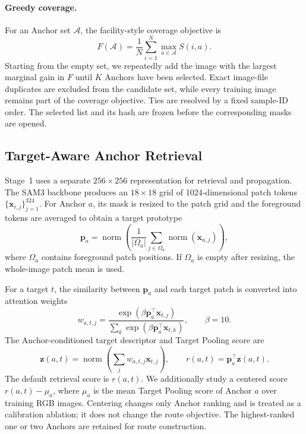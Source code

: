 \documentclass[a4paper,fleqn]{cas-dc}
\begin{document}
\paragraph{Greedy coverage.}
For an Anchor set $\mathcal{A}$, the facility-style coverage objective is
\begin{equation}
F(\mathcal{A})=\frac{1}{N}\sum_{i=1}^{N}\max_{a\in\mathcal{A}}S(i,a).
\end{equation}
Starting from the empty set, we repeatedly add the image with the largest marginal gain in $F$ until $K$ Anchors have been selected. Exact image-file duplicates are excluded from the candidate set, while every training image remains part of the coverage objective. Ties are resolved by a fixed sample-ID order. The selected list and its hash are frozen before the corresponding masks are opened.

\subsection{Target-Aware Anchor Retrieval}\label{sec:target-pooling}

Stage~1 uses a separate $256\times256$ representation for retrieval and propagation. The SAM3 backbone produces an $18\times18$ grid of 1024-dimensional patch tokens $\{\mathbf{x}_{i,j}\}_{j=1}^{324}$. For Anchor $a$, its mask is resized to the patch grid and the foreground tokens are averaged to obtain a target prototype
\begin{equation}
\mathbf{p}_a=\operatorname{norm}\left(
\frac{1}{|\Omega_a|}\sum_{j\in\Omega_a}\operatorname{norm}(\mathbf{x}_{a,j})
\right),
\end{equation}
where $\Omega_a$ contains foreground patch positions. If $\Omega_a$ is empty after resizing, the whole-image patch mean is used.

For a target $t$, the similarity between $\mathbf{p}_a$ and each target patch is converted into attention weights
\begin{equation}
w_{a,t,j}=\frac{\exp(\beta\mathbf{p}_a^{\top}\mathbf{x}_{t,j})}
{\sum_k\exp(\beta\mathbf{p}_a^{\top}\mathbf{x}_{t,k})},
\qquad \beta=10.
\end{equation}
The Anchor-conditioned target descriptor and Target Pooling score are
\begin{equation}
\mathbf{z}(a,t)=\operatorname{norm}\left(\sum_jw_{a,t,j}\mathbf{x}_{t,j}\right),
\qquad
r(a,t)=\mathbf{p}_a^{\top}\mathbf{z}(a,t).
\end{equation}
The default retrieval score is $r(a,t)$. We additionally study a centered score $r(a,t)-\mu_a$, where $\mu_a$ is the mean Target Pooling score of Anchor $a$ over training RGB images. Centering changes only Anchor ranking and is treated as a calibration ablation; it does not change the route objective. The highest-ranked one or two Anchors are retained for route construction.
\end{document}
